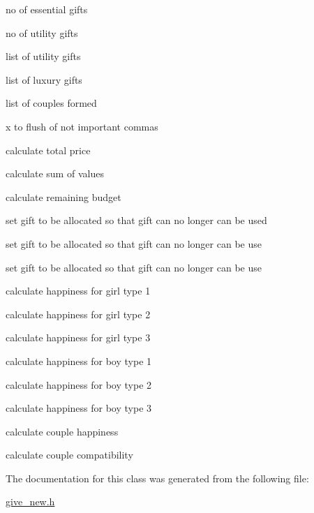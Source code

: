 no of essential gifts

no of utility gifts

list of utility gifts

list of luxury gifts

list of couples formed

x to flush of not important commas

calculate total price

calculate sum of values

calculate remaining budget

set gift to be allocated so that gift can no longer can be used

set gift to be allocated so that gift can no longer can be use

set gift to be allocated so that gift can no longer can be use

calculate happiness for girl type 1

calculate happiness for girl type 2

calculate happiness for girl type 3

calculate happiness for boy type 1

calculate happiness for boy type 2

calculate happiness for boy type 3

calculate couple happiness

calculate couple compatibility 

The documentation for this class was generated from the following file\+:\begin{DoxyCompactItemize}
\item 
\hyperlink{give__new_8h}{give\+\_\+new.\+h}\end{DoxyCompactItemize}
